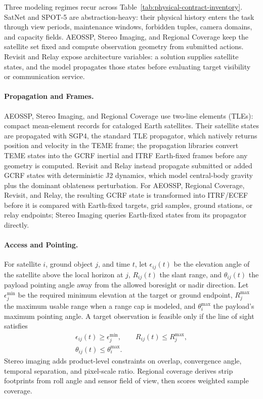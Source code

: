 \documentclass[]{mosi}
\begin{document}
Three modeling regimes recur across Table~\ref{tab:physical-contract-inventory}. SatNet and SPOT-5 are abstraction-heavy: their physical history enters the task through view periods, maintenance windows, forbidden tuples, camera domains, and capacity fields. AEOSSP, Stereo Imaging, and Regional Coverage keep the satellite set fixed and compute observation geometry from submitted actions. Revisit and Relay expose architecture variables: a solution supplies satellite states, and the model propagates those states before evaluating target visibility or communication service.

\paragraph{Propagation and Frames.} AEOSSP, Stereo Imaging, and Regional Coverage use two-line elements (TLEs): compact mean-element records for cataloged Earth satellites. Their satellite states are propagated with SGP4, the standard TLE propagator, which natively returns position and velocity in the TEME frame; the propagation libraries convert TEME states into the GCRF inertial and ITRF Earth-fixed frames before any geometry is computed. Revisit and Relay instead propagate submitted or added GCRF states with deterministic J2 dynamics, which model central-body gravity plus the dominant oblateness perturbation. For AEOSSP, Regional Coverage, Revisit, and Relay, the resulting GCRF state is transformed into ITRF/ECEF before it is compared with Earth-fixed targets, grid samples, ground stations, or relay endpoints; Stereo Imaging queries Earth-fixed states from its propagator directly.

\paragraph{Access and Pointing.} For satellite \(i\), ground object \(j\), and time \(t\), let \(\epsilon_{ij}(t)\) be the elevation angle of the satellite above the local horizon at \(j\), \(R_{ij}(t)\) the slant range, and \(\theta_{ij}(t)\) the payload pointing angle away from the allowed boresight or nadir direction. Let \(\epsilon_j^{\min}\) be the required minimum elevation at the target or ground endpoint, \(R_j^{\max}\) the maximum usable range when a range cap is modeled, and \(\theta_i^{\max}\) the payload's maximum pointing angle. A target observation is feasible only if the line of sight satisfies
\[
  \begin{aligned}
  \epsilon_{ij}(t)\ge \epsilon_j^{\min},\qquad
  R_{ij}(t)\le R_j^{\max},\\
  \theta_{ij}(t)\le \theta_i^{\max}.
  \end{aligned}
\]
Stereo imaging adds product-level constraints on overlap, convergence angle, temporal separation, and pixel-scale ratio. Regional coverage derives strip footprints from roll angle and sensor field of view, then scores weighted sample coverage.
\end{document}
